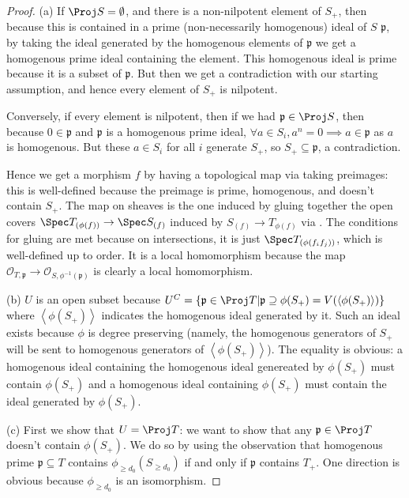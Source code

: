 \begin{proof}
	(a) If $\Proj S = \emptyset$, and there is a non-nilpotent element of $S_+ $, then because this is contained in a prime (non-necessarily homogenous) ideal of $S $ $\mathfrak{p} $, by taking the ideal generated by the homogenous elements of $\mathfrak{p} $ we get a homogenous prime ideal containing the element.
	This homogenous ideal is prime because it is a subset of $\mathfrak{p} $.
	But then we get a contradiction with our starting assumption, and hence every element of $S_+ $ is nilpotent.

	Conversely, if every element is nilpotent, then if we had $\mathfrak{p} \in \Proj S $, then because $0 \in \mathfrak{p} $ and $\mathfrak{p} $ is a homogenous prime ideal, $\forall a \in S_i, a^n = 0 \implies a \in \mathfrak{p}$ as $a $ is homogenous.
	But these $a \in S_i $ for all $i $ generate $S_+ $, so $S_+ \subseteq \mathfrak{p} $, a contradiction.

	Hence we get a morphism $f $ by having a topological map via taking preimages: this is well-defined because the preimage is prime, homogenous, and doesn't contain $S_+ $.
	The map on sheaves is the one induced by gluing together the open covers $\Spec T_{(\phi(f))} \to \Spec S_{(f)}$ induced by $S_{(f)}\to T_{\phi (f)} $ via .
	The conditions for gluing are met because on intersections, it is just $\Spec T_{(\phi(f_if_j))} $, which is well-defined up to order.
	It is a local homomorphism because the map $\mathscr{O}_{T,\mathfrak{p}} \to \mathscr{O}_{S,\phi ^{-1}(\mathfrak{p})} $ is clearly a local homomorphism.

	(b) $U $ is an open subset because $U^C = \{\mathfrak{p} \in \Proj T | \mathfrak{p} \supseteq \phi(S_+) = V(\langle \phi(S_+) \rangle)\} $ where $\left< \phi(S_+) \right> $ indicates the homogenous ideal generated by it.
	Such an ideal exists because $\phi $ is degree preserving (namely, the homogenous generators of $S_+ $ will be sent to homogenous generators of $\left< \phi(S_+) \right> $).
	The equality is obvious: a homogenous ideal containing the homogenous ideal genereated by $\phi(S_+) $ must contain $\phi(S_+) $ and a homogenous ideal containing $\phi(S_+) $ must contain the ideal generated by $\phi(S_+) $.

	(c) First we show that $U = \Proj T $: we want to show that any $\mathfrak{p} \in \Proj T $ doesn't contain $\phi(S_+) $.
	We do so by using the observation that homogenous prime $\mathfrak{p} \subseteq T$ contains $\phi_{\ge d_{0}}(S_{\ge d_{0}}) $ if and only if $\mathfrak{p} $ contains $T_+ $.
	One direction is obvious because $\phi _{\ge  d_{0}} $ is an isomorphism.


\end{proof}
